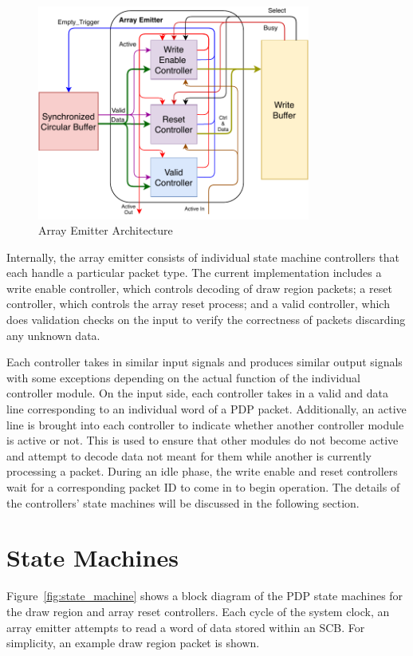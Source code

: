     \begin{figure}[t]
        \centering
        \includegraphics[width=0.80\textwidth]{fig/pdp_ae_arch.pdf}
        \caption{Array Emitter Architecture}
        \label{fig:ae_arch}
    \end{figure}

    Internally, the array emitter consists of individual state machine controllers that each handle a particular packet type. The current implementation includes a write enable controller, which controls decoding of draw region packets; a reset controller, which controls the array reset process; and a valid controller, which does validation checks on the input to verify the correctness of packets discarding any unknown data.

    Each controller takes in similar input signals and produces similar output signals with some exceptions depending on the actual function of the individual controller module. On the input side, each controller takes in a valid and data line corresponding to an individual word of a PDP packet. Additionally, an active line is brought into each controller to indicate whether another controller module is active or not. This is used to ensure that other modules do not become active and attempt to decode data not meant for them while another is currently processing a packet. During an idle phase, the write enable and reset controllers wait for a corresponding packet ID to come in to begin operation. The details of the controllers' state machines will be discussed in the following section.

\section{State Machines}
    \label{sec:state_machines}
    Figure~\ref{fig:state_machine} shows a block diagram of the PDP state machines for the draw region and array reset controllers. Each cycle of the system clock, an array emitter attempts to read a word of data stored within an SCB. For simplicity, an example draw region packet is shown.

